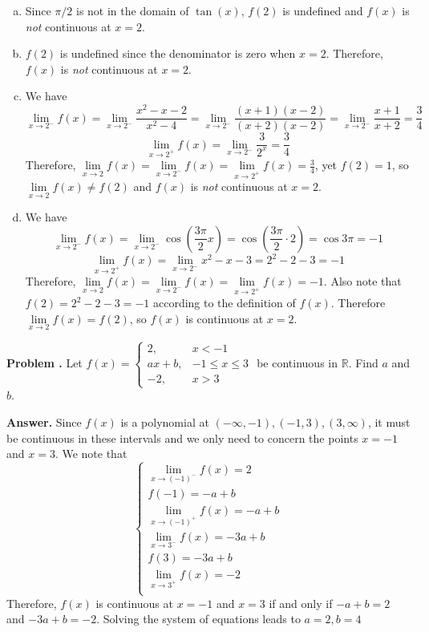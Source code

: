 \documentclass[11pt,letterpaper]{article}
\newcounter{problem}
\newcommand{\problem}{
	\stepcounter{problem}%
	\noindent \textbf{Problem \theproblem. }%
}
\newcommand{\answer}{\noindent \textbf{Answer. }}
\begin{document}
\begin{enumerate}[(a)]
    \item Since $\pi/2$ is not in the domain of $\tan(x)$, $f(2)$ is undefined and $f(x)$ is \textit{not} continuous at $x=2$.
    \item $f(2)$ is undefined since the denominator is zero when $x=2$. Therefore, $f(x)$ is \textit{not} continuous at $x=2$.
    \item We have
    \[\lim\limits_{x \to  2^-} f(x) = \lim\limits_{x \to  2^-} \frac{x^2-x-2}{x^2-4} = \lim\limits_{x \to  2^-} \frac{(x+1)(x-2)}{(x+2)(x-2)} = \lim\limits_{x \to  2^-} \frac{x+1}{x+2} = \frac{3}{4}\]
    \[\lim\limits_{x \to  2^+} f(x) = \lim\limits_{x \to  2^-} \frac{3}{2^x} = \frac{3}{4}\]
    Therefore, $\lim\limits_{x \to  2} f(x) = \lim\limits_{x \to  2^-} f(x) = \lim\limits_{x \to  2^+} f(x) = \frac{3}{4}$, yet $f(2) = 1$, so $\lim\limits_{x \to  2} f(x) \ne f(2)$ and $f(x)$ is \textit{not} continuous at $x=2$.
    \item We have 
    \[\lim\limits_{x \to  2^-} f(x) = \lim\limits_{x \to  2^-} \cos\left(\frac{3\pi}{2}x\right) = \cos \left(\frac{3\pi}{2}\cdot 2\right) = \cos 3\pi = -1\]
    \[\lim\limits_{x \to  2^+} f(x) = \lim\limits_{x \to  2^-} x^2-x-3 = 2^2-2-3 = -1\]
    Therefore, $\lim\limits_{x \to  2} f(x) = \lim\limits_{x \to  2^-} f(x) = \lim\limits_{x \to  2^+} f(x) = -1$.  Also note that $f(2) = 2^2-2-3 = -1$ according to the definition of $f(x)$.  Therefore $\lim\limits_{x \to  2} f(x) = f(2)$, so $f(x)$ is continuous at $x=2$.
\end{enumerate}\vspace{6mm}

\problem Let $f(x) = \left\{\begin{array}{lr}
        2, & x < -1\\
        ax+b, & -1 \le x \le 3\\
        -2, & x > 3
        \end{array}\right.$ be continuous in $\mathbb{R}$. Find $a$ and $b$.
\vspace{6mm}

\answer Since $f(x)$ is a polynomial at $(-\infty, -1), (-1, 3), (3, \infty)$, it must be continuous in these intervals and we only need to concern the points $x=-1$ and $x=3$. We note that 
\[\left\{\begin{array}{l}
    \lim\limits_{x \to  (-1)^-} f(x) = 2\\
    f(-1) = -a+b\\
    \lim\limits_{x \to  (-1)^+} f(x) = -a+b\\
    \lim\limits_{x \to  3^-} f(x) = -3a+b\\
    f(3) = -3a+b\\
    \lim\limits_{x \to  3^+} f(x) = -2\\
\end{array}\right.\]
Therefore, $f(x)$ is continuous at $x=-1$ and $x=3$ if and only if $-a+b = 2$ and $-3a+b = -2$. Solving the system of equations leads to $a=2, b=4$
\vspace{6mm}
\end{document}
